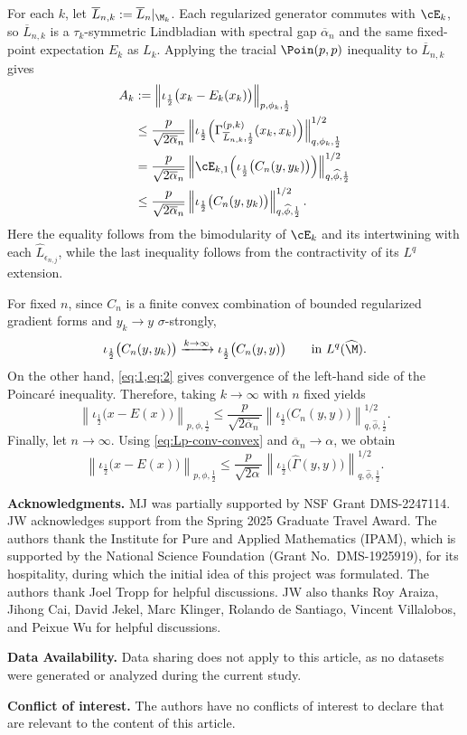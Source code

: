 \documentclass[sn-mathphys-num]{sn-jnl}
\begin{document}
For each $k$, let
$\overline L_{n,k}:=\overline L_n|_{\M_k}$.  Each regularized generator
commutes with $\cE_k$, so $\overline L_{n,k}$ is a
$\tau_k$-symmetric Lindbladian with spectral gap
$\overline\alpha_n$ and the same fixed-point expectation $E_k$ as
$L_k$.  Applying the tracial $\Poin(p,p)$ inequality to
$\overline L_{n,k}$ gives
\begin{align*}
A_k
&:=
\left\|\iota_{\frac12}\bigl(x_k-E_k(x_k)\bigr)
\right\|_{p,\phi_k,\frac12}
\\
&\le
\frac{p}{\sqrt{2\overline\alpha_n}}
\left\|
\iota_{\frac12}\Bigl(
\Gamma_{\overline L_{n,k},\frac12}^{(p,k)}(x_k,x_k)
\Bigr)
\right\|_{q,\phi_k,\frac12}^{1/2}
\\
&=
\frac{p}{\sqrt{2\overline\alpha_n}}
\left\|
\cE_{k,1}\!\left(
\iota_{\frac12}\bigl(C_n(y,y_k)\bigr)
\right)
\right\|_{q,\widehat\phi,\frac12}^{1/2}
\\
&\le
\frac{p}{\sqrt{2\overline\alpha_n}}
\left\|
\iota_{\frac12}\bigl(C_n(y,y_k)\bigr)
\right\|_{q,\widehat\phi,\frac12}^{1/2}.
\end{align*}
Here the equality follows from the bimodularity of $\cE_k$ and its
intertwining with each $\widehat L_{\epsilon_{n,j}}$, while the last
inequality follows from the contractivity of its $L^q$ extension.

For fixed $n$, since $C_n$ is a finite convex combination of bounded
regularized gradient forms and $y_k\to y$ $\sigma$-strongly,
\[
\iota_{\frac12}\bigl(C_n(y,y_k)\bigr)
\xrightarrow{k\to\infty}
\iota_{\frac12}\bigl(C_n(y,y)\bigr)
\qquad\text{in }L^q(\widehat\M).
\]
On the other hand, \cref{eq:1,eq:2} gives convergence of the left-hand side of the Poincar\'e inequality.
Therefore, taking $k\to\infty$ with $n$ fixed yields
\[
\left\|\iota_{\frac12}\bigl(x-E(x)\bigr)
\right\|_{p,\phi,\frac12}
\le
\frac{p}{\sqrt{2\overline\alpha_n}}
\left\|
\iota_{\frac12}\bigl(C_n(y,y)\bigr)
\right\|_{q,\widehat\phi,\frac12}^{1/2}.
\]
Finally, let $n\to\infty$.  Using
\cref{eq:Lp-conv-convex} and
$\overline\alpha_n\to\alpha$, we obtain
\[
\left\|\iota_{\frac12}\bigl(x-E(x)\bigr)
\right\|_{p,\phi,\frac12}
\le
\frac{p}{\sqrt{2\alpha}}
\left\|
\iota_{\frac12}\bigl(\widehat\Gamma(y,y)\bigr)
\right\|_{q,\widehat\phi,\frac12}^{1/2}.
\]

\medskip
\textbf{Acknowledgments.}
MJ was partially supported by NSF Grant DMS-2247114. JW acknowledges support from the Spring 2025 Graduate Travel Award. The authors thank the Institute for Pure and Applied Mathematics (IPAM), which is supported by the
National Science Foundation (Grant No.~DMS-1925919), for its hospitality, during which the initial
idea of this project was formulated. The authors thank Joel Tropp for helpful discussions.
JW also thanks Roy Araiza, Jihong Cai, David Jekel, Marc Klinger, Rolando de Santiago,
Vincent Villalobos, and Peixue Wu for helpful discussions.

\textbf{Data Availability.}{
Data sharing does not apply to this article, as no datasets were generated or
analyzed during the current study.}

\textbf{Conflict of interest.}{
The authors have no conflicts of interest to declare that are relevant to the
content of this article.}

\end{document}
